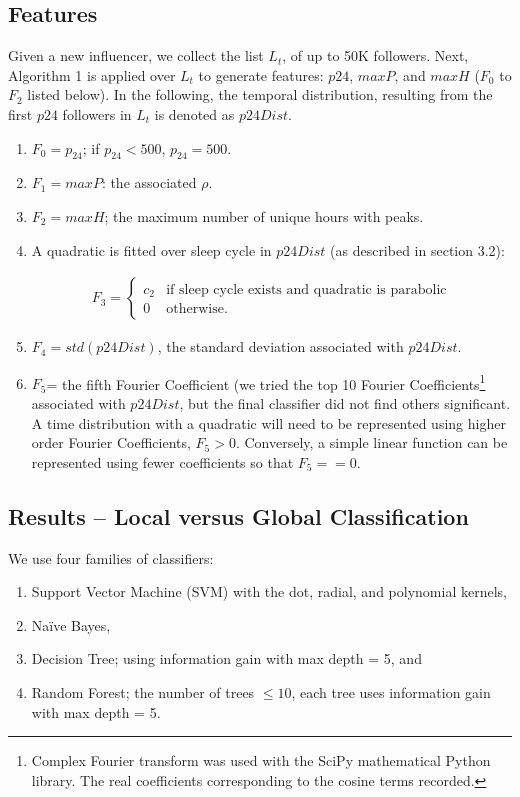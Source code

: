 \subsection{Features}

Given a new influencer, we  collect  the list $L_t$, of up to 50K followers. Next, Algorithm 1 is applied over $L_t$ to generate features: $p24$, $maxP$, and $maxH$ ($F_0$ to $F_{2}$  listed below). In the following, the temporal distribution, resulting from the first $p24$ followers in $L_t$ is denoted as $p24Dist$. 
\begin{enumerate}
\item $F_0=p_{24}$; if $p_{24} < 500$, $p_{24} = 500$.
\item $F_1=maxP$:  the associated $\rho$.
\item $F_2=maxH$; the maximum number of unique hours with peaks.
\item A quadratic is fitted over sleep cycle in $p24Dist$ (as described in section 3.2):

\begin{eqnarray*}
F_3 = \left\{
\begin{array}{ll}
c_2 & \mbox{if sleep cycle exists and quadratic is parabolic}\\
0 & \mbox{otherwise.}
\end{array}
\right.
\end{eqnarray*}
\item  $F_4=std(p24Dist)$, the standard deviation associated with $p24Dist$.
\item $F_5$= the fifth Fourier Coefficient (we tried the top 10 Fourier Coefficients\footnote{Complex Fourier transform was used with the SciPy mathematical Python library. The real coefficients corresponding to the cosine terms recorded.} associated with $p24Dist$, but the final classifier did not find others significant. A time distribution with a quadratic will need to be represented using higher order Fourier Coefficients, $F_5>0$. Conversely, a simple linear function can be represented using fewer coefficients so that $F_5==0$.
\end{enumerate}
 
\subsection{ Results -- Local versus Global Classification}
We use four families of classifiers:
\begin{enumerate}
\item Support Vector Machine (SVM) with the dot, radial, and polynomial kernels, 
\item Na\"ive Bayes, 
\item  Decision Tree; using information gain with max depth = 5, and 
\item Random Forest; the number  of trees $\leq 10$, each tree uses information gain with max depth = 5.
\end{enumerate}


